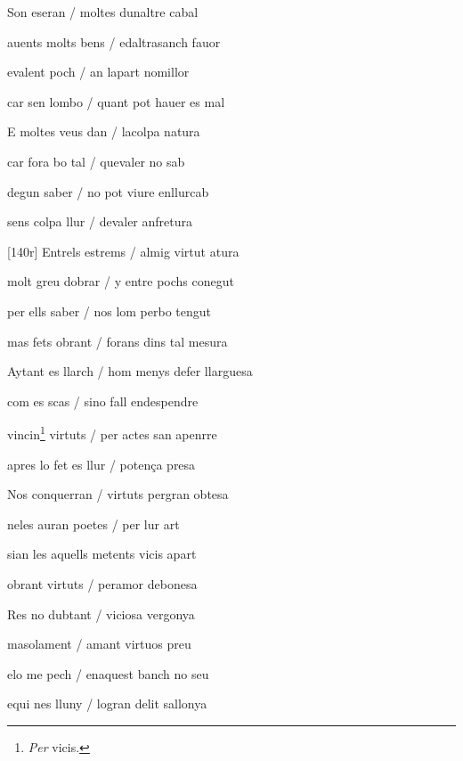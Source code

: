 \documentclass[12pt]{article}
\begin{document}
\begin{estrofa}

 Son eseran / moltes dunaltre cabal

 auents molts bens / edaltrasanch fauor

 evalent poch / an lapart nomillor

 car sen lombo / quant pot hauer es mal

 E moltes veus dan / lacolpa natura

 car fora bo tal / quevaler no sab

 degun saber / no pot viure enllurcab

 sens colpa llur / devaler anfretura

\end{estrofa}



\begin{estrofa}

 [140r] Entrels estrems / almig virtut atura

 molt greu dobrar / y entre pochs conegut

 per ells saber / nos lom perbo tengut

 mas fets obrant / forans dins tal mesura

 Aytant es llarch / hom menys defer llarguesa

 com es scas / sino fall endespendre

 vincin\footnote{\textit{Per} vicis.} virtuts / per actes san apenrre

 apres lo fet es llur / poten\c{c}a presa

\end{estrofa}



\begin{estrofa}

 Nos conquerran / virtuts pergran obtesa

 neles auran poetes / per lur art

 sian les aquells metents vicis apart

 obrant virtuts / peramor debonesa

 Res no dubtant / viciosa vergonya

 masolament / amant virtuos preu

 elo me pech / enaquest banch no seu

 equi nes lluny / logran delit sallonya

\end{estrofa}
\end{document}
